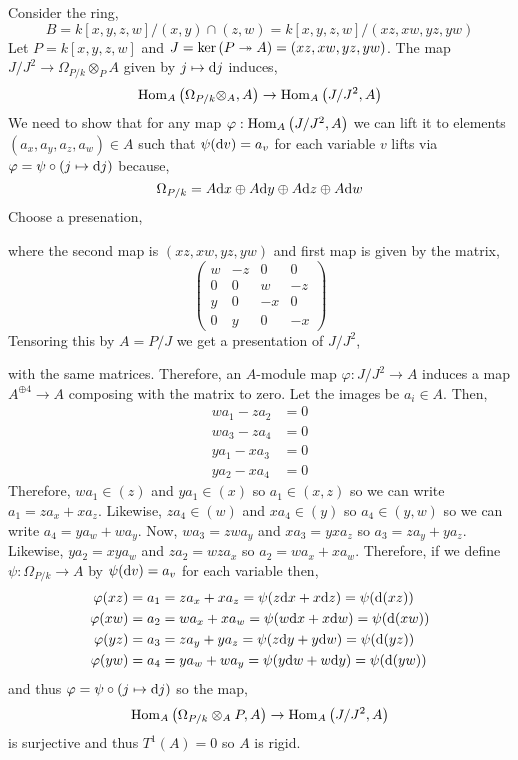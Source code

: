 \documentclass[12pt]{article}
\begin{document}
Consider the ring,
\[ B = k[x,y,z,w]/(x,y) \cap (z,w) = k[x,y,z,w]/(xz,xw,yz,yw) \]
Let $P = k[x,y,z,w]$ and $J = \ker{(P \twoheadrightarrow A)} = (xz,xw,yz,yw)$. The map $J/J^2 \to \Omega_{P/k} \otimes_P A$ given by $j \mapsto \mathrm{d}{j}$ induces,
\[ \mathrm{Hom}_{A} \left( \Omega_{P/k} \otimes_A, A \right) \to \mathrm{Hom}_{A} \left( J/J^2, A \right) \]
We need to show that for any map $\varphi : \mathrm{Hom}_{A} \left( J/J^2, A \right)$ we can lift it to elements $(a_x, a_y, a_z, a_w) \in A$ such that $\psi(\mathrm{d}{v}) = a_v$ for each variable $v$ lifts via $\varphi = \psi \circ (j \mapsto \mathrm{d}{j})$ because, 
\[ \Omega_{P/k} = A \mathrm{d}{x} \oplus A \mathrm{d}{y} \oplus A \mathrm{d}{z} \oplus A \mathrm{d}{w} \]
Choose a presenation,
\begin{center}
\end{center}
where the second map is $(xz, xw, yz, yw)$ and first map is given by the matrix,
\[ \begin{pmatrix}
w & - z & 0 & 0
\\
0 & 0 & w & - z
\\
y & 0 & -x & 0
\\
0 & y & 0 & -x
\end{pmatrix} \]
Tensoring this by $A = P/J$ we get a presentation of $J/J^2$,
\begin{center}
\end{center}
with the same matrices. Therefore, an $A$-module map $\varphi : J/J^2 \to A$ induces a map $A^{\oplus 4} \to A$ composing with the matrix to zero. Let the images be $a_i \in A$. Then, 
\begin{align*}
w a_1 - z a_2 &= 0
\\
w a_3 - z a_4 &= 0
\\
y a_1 - x a_3 &= 0
\\
y a_2 - x a_4 &= 0
\end{align*}
Therefore, $w a_1 \in (z)$ and $y a_1 \in (x)$ so $a_1 \in (x, z)$ so we can write $a_1 = z a_x + x a_z$. Likewise, $z a_4 \in (w)$ and $x a_4 \in (y)$ so $a_4 \in (y,w)$ so we can write $a_4 = y a_w + w a_y$. Now, $w a_3 = zw a_y$ and $x a_3 = yx a_z$ so $a_3 = z a_y + y a_z$. Likewise, $y a_2 = xy a_w$ and $z a_2 = w z a_x$ so $a_2 = w a_x + x a_w$. Therefore, if we define $\psi : \Omega_{P/k} \to A$ by $\psi(\mathrm{d}{v}) = a_v$ for each variable then,
\begin{align*}
\varphi(xz) = a_1 & = z a_x + x a_z = \psi(z \mathrm{d}{x} + x \mathrm{d}{z}) = \psi(\mathrm{d}{(xz)})
\\
\varphi(xw) = a_2 & = w a_x + x a_w = \psi(w \mathrm{d}{x} + x \mathrm{d}{w}) = \psi(\mathrm{d}{(xw)})
\\
\varphi(yz) = a_3 & = z a_y + y a_z = \psi(z \mathrm{d}{y} + y \mathrm{d}{w}) = \psi(\mathrm{d}{(yz)})
\\
\varphi(yw) = a_4 & = y a_w + w a_y = \psi(y \mathrm{d}{w} + w \mathrm{d}{y}) = \psi(\mathrm{d}{(yw)})
\end{align*}
and thus $\varphi = \psi \circ (j \mapsto \mathrm{d}{j})$ so the map,
\[ \mathrm{Hom}_{A} \left( \Omega_{P/k} \otimes_A P, A \right) \to \mathrm{Hom}_{A} \left( J/J^2, A \right) \]
is surjective and thus $T^1(A) = 0$ so $A$ is rigid.
\end{document}
